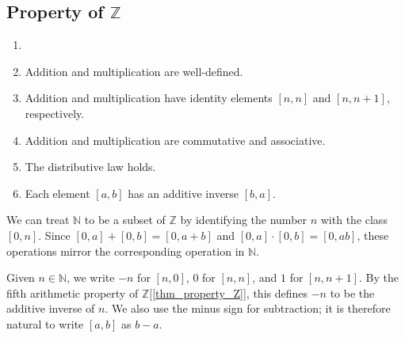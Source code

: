 \documentclass{report}
\begin{document}
\begin{comment}%
			\begin{prop}
				The subset $\mathbb{N}=\{[0,n]|n \text{ is a natural number}\}$ is a positive set in $\mathbb{Z}$.
			\end{prop}
		
			\begin{proof}
				$\mathbb{N}$ is closed under addition and multiplication by definition.\\
				Let $[a,b] \in  \mathbb{Z}$. Since $a,b \in \mathbb{N}$ and $\mathbb{N}$ is well-ordered, either $a<b$, $a=b$, or $b<a$. So either $[a,b]$ is $[0,b-a]$, $[0,0]$, or $[a-b,0]$.\\
				Thus either $[a,b]\in\mathbb{N}$, $[a,b]=0$, or $-[a,b]=[b,a]\in\mathbb{n}$.
			\end{proof}
\end{comment}
	
		\subsection{Property of $\mathbb{Z}$}
		
			\begin{thm} \label{thm_property_Z}
				\begin{enumerate}
					\item[]
					\item Addition and multiplication are well-defined.
					\item Addition and multiplication have identity elements $[n,n]$ and $[n,n+1]$, respectively.
					\item Addition and multiplication are commutative and associative.
					\item The distributive law holds.
					\item Each element $[a,b]$ has an additive inverse $[b,a]$.
				\end{enumerate}
			\end{thm}
	
			We can treat $\mathbb{N}$ to be a subset of $\mathbb{Z}$ by identifying the number $n$ with the class $[0,n]$. Since $[0,a]+[0,b]=[0,a+b]$ and $[0,a] \cdot [0,b]=[0,ab]$, these operations mirror the corresponding operation in $\mathbb{N}$.
			
			Given $n \in \mathbb{N}$, we write $-n$ for $[n,0]$, $0$ for $[n,n]$, and $1$ for $[n,n+1]$. By the fifth arithmetic property of $\mathbb{Z}$[\ref{thm_property_Z}], this defines $-n$ to be the additive inverse of $n$. We also use the minus sign for subtraction; it is therefore natural to write $[a,b]$ as $b-a$.
			
\end{document}
